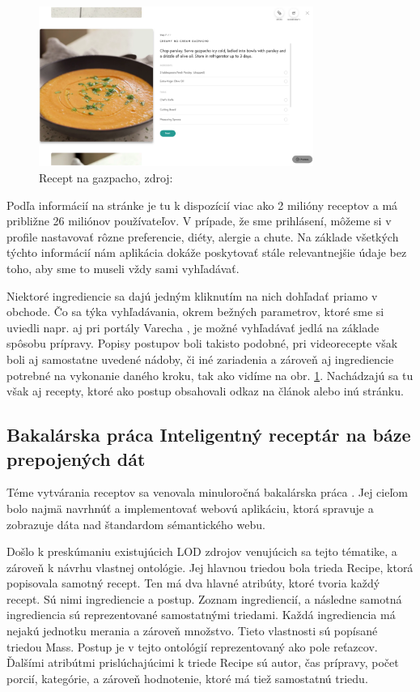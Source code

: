 {\begin{figure}[h]
\centering
\includegraphics[width=0.8\textwidth]{images/yummly}
\caption{Recept na gazpacho, zdroj: \cite{yummly}}
\label{yummly}
\end{figure}

Podľa informácií na stránke \cite{yummly} je tu k dispozícií viac ako 2 milióny receptov a má
približne 26 miliónov používateľov. V prípade, že sme prihlásení, môžeme si v profile
nastavovať rôzne preferencie, diéty, alergie a chute. Na základe všetkých týchto informácií nám aplikácia dokáže poskytovať stále relevantnejšie údaje bez toho, aby sme to
museli vždy sami vyhľadávať.

Niektoré ingrediencie sa dajú jedným kliknutím na nich dohľadať priamo v obchode.
Čo sa týka vyhľadávania, okrem bežných parametrov, ktoré sme si uviedli napr. aj pri
portály Varecha \cite{varecha}, je možné vyhľadávať jedlá na základe spôsobu prípravy. Popisy
postupov boli takisto podobné, pri videorecepte však boli aj samostatne uvedené nádoby, či iné zariadenia a zároveň aj ingrediencie potrebné na vykonanie daného kroku,
tak ako vidíme na obr. \ref{yummly}. Nachádzajú sa tu však aj recepty, ktoré ako postup
obsahovali odkaz na článok alebo inú stránku.


\subsection{Bakalárska práca Inteligentný receptár na báze prepojených dát}
Téme vytvárania receptov sa venovala minuloročná bakalárska práca \cite{bakalarka}. Jej cieľom
bolo najmä navrhnúť a implementovať webovú aplikáciu, ktorá spravuje a zobrazuje
dáta nad štandardom sémantického webu.

Došlo k preskúmaniu existujúcich LOD zdrojov venujúcich sa tejto tématike, a
zároveň k návrhu vlastnej ontológie. Jej hlavnou triedou bola trieda Recipe, ktorá popisovala samotný recept. Ten má dva hlavné atribúty, ktoré tvoria každý recept. Sú
nimi ingrediencie a postup. Zoznam ingrediencií, a následne samotná ingrediencia sú
reprezentované samostatnými triedami. Každá ingrediencia má nejakú jednotku merania a zároveň množstvo. Tieto vlastnosti sú popísané triedou Mass. Postup je v tejto
ontológií reprezentovaný ako pole reťazcov. Ďalšími atribútmi prislúchajúcimi k triede
Recipe sú autor, čas prípravy, počet porcií, kategórie, a zároveň hodnotenie, ktoré má
tiež samostatnú triedu.

}
